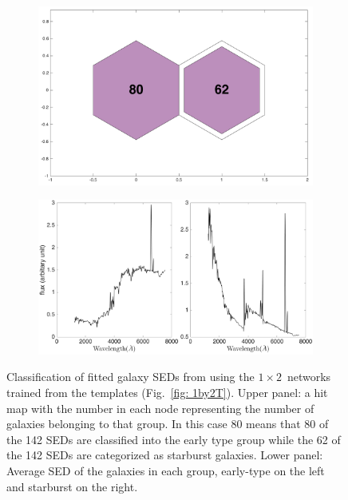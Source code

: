             \begin{figure}
                \begin{subfigure}[b]{0.5\textwidth}
                    \centering
                    \includegraphics[width=\textwidth]{../image_paper2/1d/hit_v_1_by_2.png}
                \end{subfigure}
                \hfill
                \begin{subfigure}[b]{0.5\textwidth}
                     \includegraphics[width=\textwidth]{../image_paper2/1d/SED_total1by2.png}
                \end{subfigure}
                \caption{Classification of fitted galaxy SEDs from \citet{Hossein12} using the $1\times2$~networks trained from the \citet{Kinney96} templates (Fig.~\ref{fig: 1by2T}). Upper panel: a hit map with the number in each node representing the number of galaxies belonging to that group. In this case 80 means that 80 of the 142 SEDs are classified into the early type group while the 62 of the 142 SEDs are categorized as starburst galaxies. Lower panel: Average SED of the galaxies in each group, early-type on the left and starburst on the right.}
                \label{fig: 1by2V}
            \end{figure}          
            

